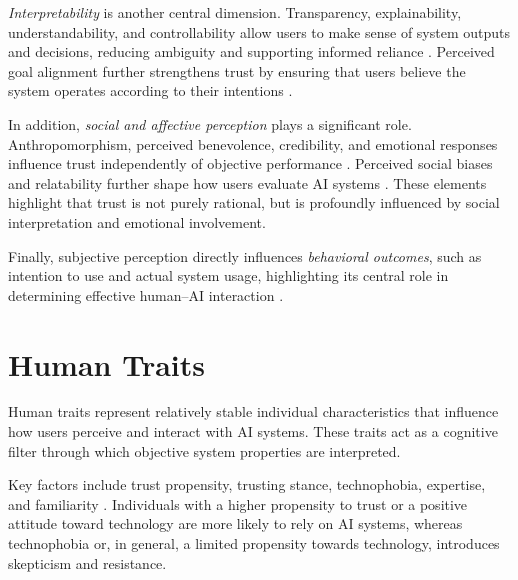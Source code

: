 \documentclass[sigconf]{acmart}
\begin{document}
\emph{Interpretability} is another central dimension. Transparency, explainability, understandability, and controllability allow users to make sense of system outputs and decisions, reducing ambiguity and supporting informed reliance \cite{afroogh_trust_in_ai, glickson_2020_review_of_empirical_research, naiseh_2023_class, schepman_general_attitude}. Perceived goal alignment further strengthens trust by ensuring that users believe the system operates according to their intentions \cite{afroogh_trust_in_ai}.

In addition, \emph{social and affective perception} plays a significant role. Anthropomorphism, perceived benevolence, credibility, and emotional responses influence trust independently of objective performance \cite{chi_formative_scale, yang_wibowo_2022, bach_systematic_literature_review, schepman_general_attitude}. Perceived social biases and relatability further shape how users evaluate AI systems \cite{afroogh_trust_in_ai, bach_systematic_literature_review}. These elements highlight that trust is not purely rational, but is profoundly influenced by social interpretation and emotional involvement. \cite{afroogh_trust_in_ai, jacovi_2021_formalizing_trust_ai, bach_systematic_literature_review}

Finally, subjective perception directly influences \emph{behavioral outcomes}, such as intention to use and actual system usage, highlighting its central role in determining effective human–AI interaction \cite{choudhury_chat_gpt}.

\section{Human Traits}

Human traits represent relatively stable individual characteristics that influence how users perceive and interact with AI systems. These traits act as a cognitive filter through which objective system properties are interpreted.

Key factors include trust propensity, trusting stance, technophobia, expertise, and familiarity \cite{Rheuetal.2020.SystematicReviewTrustBuildingFactors, tussyadiah_do_travelers_trust, What_factors_contribute_to_the_acceptance_of_artificial_intelligence, zhang_et_al_2023, chi_formative_scale}. Individuals with a higher propensity to trust or a positive attitude toward technology are more likely to rely on AI systems, whereas technophobia or, in general, a limited propensity towards technology, introduces skepticism and resistance.
\end{document}
